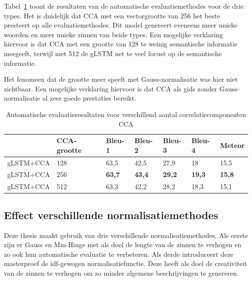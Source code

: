Tabel~\ref{table:results_cca} toont de resultaten van de automatische evaluatiemethodes voor de drie types. Het is duidelijk dat CCA met een vectorgrootte van 256 het beste presteert op alle evaluatiemethodes. Dit model genereert eveneens meer unieke woorden en meer unieke zinnen van beide types. Een mogelijke verklaring hiervoor is dat CCA met een grootte van 128 te weinig semantische informatie meegeeft, terwijl met 512 de gLSTM net te veel focust op de semantische informatie.

Het fenomeen dat de grootte meer speelt met Gauss-normalisatie was hier niet zichtbaar. Een mogelijke verklaring hiervoor is dat CCA als gids zonder Gauss-normalisatie al zeer goede prestaties bereikt.
\begin{table}
	\centering
	\begin{tabular}{lllllll}
		~              & CCA-grootte     & Bleu-1 & Bleu-2 & Bleu-3 & Bleu-4 & Meteor \\ \hline
		gLSTM+CCA & 128        & 63,5   & 42,5 			& 27,9   & 18   & 15,5  \\
		gLSTM+CCA & 256        & \textbf{63,7}   & \textbf{43,4}   & \textbf{29,2}   & \textbf{19,3}   & \textbf{15,8}  \\
		gLSTM+CCA & 512        & 63,3   & 42,2   & 28,2   & 18,3 & 15,1  \\ \hline
	
	\end{tabular}

	\caption{Automatische evaluatieresultaten voor verschillend aantal correlatiecomponenten CCA}
		\label{table:results_cca}
\end{table}

\subsection{Effect verschillende normalisatiemethodes}
Deze thesis maakt gebruik van drie verschillende normalisatiemethodes. Als eerste zijn er Gauss en Min-Hinge met als doel de lengte van de zinnen te verhogen en zo ook hun automatische evaluatie te verbeteren. Als derde introduceert deze masterproef de idf-gewogen normalisatiefunctie. Deze heeft als doel de creativiteit van de zinnen te verhogen om zo minder algemene beschrijvingen te genereren.

